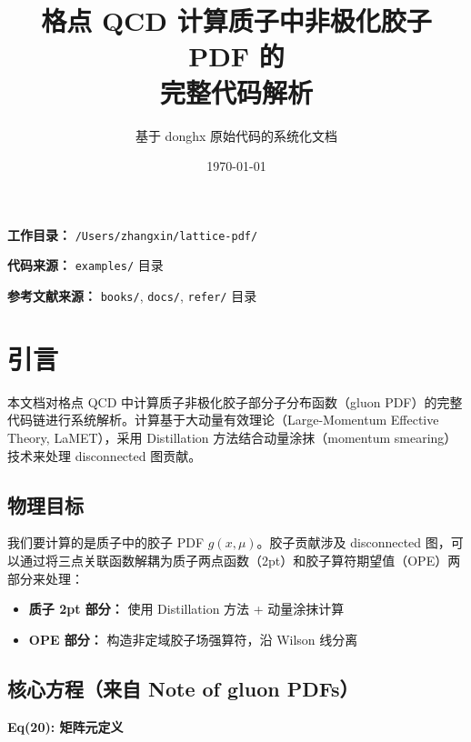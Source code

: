 \documentclass[12pt,a4paper]{ctexart}
\title{\textbf{格点 QCD 计算质子中非极化胶子 PDF 的\\完整代码解析}}
\author{基于 donghx 原始代码的系统化文档}
\date{\today}
\newcommand{\lamet}{LaMET}
\begin{document}
\maketitle
\thispagestyle{empty}

\vspace{2cm}
\begin{center}
\large
\textbf{工作目录：} \texttt{/Users/zhangxin/lattice-pdf/}

\vspace{0.5cm}
\textbf{代码来源：} \texttt{examples/} 目录

\vspace{0.5cm}
\textbf{参考文献来源：} \texttt{books/}, \texttt{docs/}, \texttt{refer/} 目录
\end{center}

\newpage
\tableofcontents
\newpage

\section{引言}

本文档对格点 QCD 中计算质子非极化胶子部分子分布函数（gluon PDF）的完整代码链进行系统解析。计算基于大动量有效理论（Large-Momentum Effective Theory, \lamet），采用 Distillation 方法结合动量涂抹（momentum smearing）技术来处理 disconnected 图贡献。

\subsection{物理目标}

我们要计算的是质子中的胶子 PDF $g(x,\mu)$。胶子贡献涉及 disconnected 图，可以通过将三点关联函数解耦为质子两点函数（2pt）和胶子算符期望值（OPE）两部分来处理：

\begin{itemize}
    \item \textbf{质子 2pt 部分：} 使用 Distillation 方法 + 动量涂抹计算
    \item \textbf{OPE 部分：} 构造非定域胶子场强算符，沿 Wilson 线分离
\end{itemize}

\subsection{核心方程（来自 Note of gluon PDFs）}

\textbf{Eq(20): 矩阵元定义}
\end{document}
